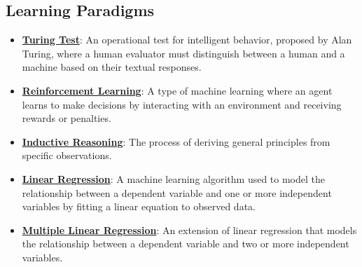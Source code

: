 \documentclass{article}%
\begin{document}
\subsection{Learning Paradigms}%
\label{subsec:LearningParadigms}%
\begin{itemize}[leftmargin=*]%
\item \href{https://purdue.brightspace.com/d2l/common/assets/pdfjs-d2l-dist/1.0.14-legacy/web/viewer.html?file=\%2Fcontent\%2Fenforced\%2F1095467-wl.202510.CS.24300.001\%2F02L2-Intro.pdf\%3Fou\%3D1095467\&lang=en-us\&container=d2l-fileviewer-rendered-pdf\&fullscreen=d2l-fileviewer-rendered-pdf-dialog\&height=667#page=6}{\textbf{Turing Test}}: An operational test for intelligent behavior, proposed by Alan Turing, where a human evaluator must distinguish between a human and a machine based on their textual responses.%
\item \href{https://purdue.brightspace.com/d2l/common/assets/pdfjs-d2l-dist/1.0.14-legacy/web/viewer.html?file=\%2Fcontent\%2Fenforced\%2F1095467-wl.202510.CS.24300.001\%2F02L2-Intro.pdf\%3Fou\%3D1095467\&lang=en-us\&container=d2l-fileviewer-rendered-pdf\&fullscreen=d2l-fileviewer-rendered-pdf-dialog\&height=667#page=46}{\textbf{Reinforcement Learning}}: A type of machine learning where an agent learns to make decisions by interacting with an environment and receiving rewards or penalties.%
\item \href{https://purdue.brightspace.com/d2l/common/assets/pdfjs-d2l-dist/1.0.14-legacy/web/viewer.html?file=\%2Fcontent\%2Fenforced\%2F1095467-wl.202510.CS.24300.001\%2F05L2-ML Basics.pdf\%3Fou\%3D1095467\&lang=en-us\&container=d2l-fileviewer-rendered-pdf\&fullscreen=d2l-fileviewer-rendered-pdf-dialog\&height=667#page=3}{\textbf{Inductive Reasoning}}: The process of deriving general principles from specific observations.%
\item \href{https://purdue.brightspace.com/d2l/common/assets/pdfjs-d2l-dist/1.0.14-legacy/web/viewer.html?file=\%2Fcontent\%2Fenforced\%2F1095467-wl.202510.CS.24300.001\%2F05L2-ML Basics.pdf\%3Fou\%3D1095467\&lang=en-us\&container=d2l-fileviewer-rendered-pdf\&fullscreen=d2l-fileviewer-rendered-pdf-dialog\&height=667#page=6}{\textbf{Linear Regression}}: A machine learning algorithm used to model the relationship between a dependent variable and one or more independent variables by fitting a linear equation to observed data.%
\item \href{https://purdue.brightspace.com/d2l/common/assets/pdfjs-d2l-dist/1.0.14-legacy/web/viewer.html?file=\%2Fcontent\%2Fenforced\%2F1095467-wl.202510.CS.24300.001\%2F05L2-ML Basics.pdf\%3Fou\%3D1095467\&lang=en-us\&container=d2l-fileviewer-rendered-pdf\&fullscreen=d2l-fileviewer-rendered-pdf-dialog\&height=667#page=11}{\textbf{Multiple Linear Regression}}: An extension of linear regression that models the relationship between a dependent variable and two or more independent variables.%

\end{itemize}
\end{document}
